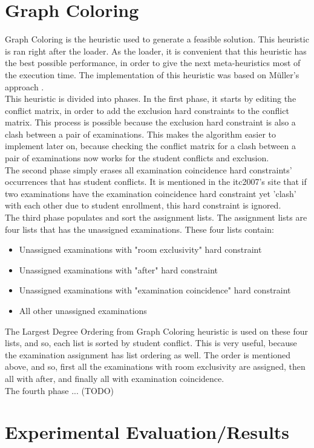\section{Graph Coloring}

Graph Coloring is the heuristic used to generate a feasible solution. This heuristic is ran right after the loader. As the loader, it is convenient that this heuristic has the best possible performance, in order to give the next meta-heuristics most of the execution time. The implementation of this heuristic was based on M\"{u}ller's approach \cite{Mueller2009}.\\

This heuristic is divided into phases. In the first phase, it starts by editing the conflict matrix, in order to add the exclusion hard constraints to the conflict matrix. This process is possible because the exclusion hard constraint is also a clash between a pair of examinations. This makes the algorithm easier to implement later on, because checking the conflict matrix for a clash between a pair of examinations now works for the student conflicts and exclusion.\\

The second phase simply erases all examination coincidence hard constraints' occurrences that has student conflicts. It is mentioned in the \gls{itc2007}'s site \cite{McCollum2007d} that if two examinations have the examination coincidence hard constraint yet 'clash' with each other due to student enrollment, this hard constraint is ignored.\\

The third phase populates and sort the assignment lists. The assignment lists are four lists that has the unassigned examinations. These four lists contain:
\begin{itemize}
	\item Unassigned examinations with "room exclusivity" hard constraint
	\item Unassigned examinations with "after" hard constraint
	\item Unassigned examinations with "examination coincidence" hard constraint
	\item All other unassigned examinations
\end{itemize}
The Largest Degree Ordering from Graph Coloring heuristic is used on these four lists, and so, each list is sorted by student conflict. This is very useful, because the examination assignment has list ordering as well. The order is mentioned above, and so, first all the examinations with room exclusivity are assigned, then all with after, and finally all with examination coincidence.\\

The fourth phase ... (TODO)

\section{Experimental Evaluation/Results}